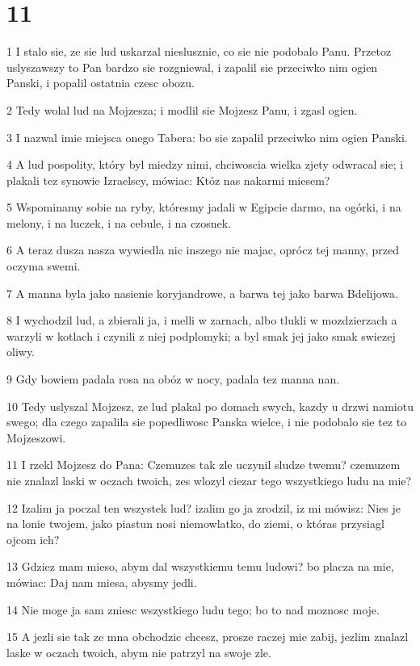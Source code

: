 \chapter{11}

\par 1 I stalo sie, ze sie lud uskarzal nieslusznie, co sie nie podobalo Panu. Przetoz uslyszawszy to Pan bardzo sie rozgniewal, i zapalil sie przeciwko nim ogien Panski, i popalil ostatnia czesc obozu.
\par 2 Tedy wolal lud na Mojzesza; i modlil sie Mojzesz Panu, i zgasl ogien.
\par 3 I nazwal imie miejsca onego Tabera: bo sie zapalil przeciwko nim ogien Panski.
\par 4 A lud pospolity, który byl miedzy nimi, chciwoscia wielka zjety odwracal sie; i plakali tez synowie Izraelscy, mówiac: Któz nas nakarmi miesem?
\par 5 Wspominamy sobie na ryby, któresmy jadali w Egipcie darmo, na ogórki, i na melony, i na luczek, i na cebule, i na czosnek.
\par 6 A teraz dusza nasza wywiedla nic inszego nie majac, oprócz tej manny, przed oczyma swemi.
\par 7 A manna byla jako nasienie koryjandrowe, a barwa tej jako barwa Bdelijowa.
\par 8 I wychodzil lud, a zbierali ja, i melli w zarnach, albo tlukli w mozdzierzach a warzyli w kotlach i czynili z niej podplomyki; a byl smak jej jako smak swiezej oliwy.
\par 9 Gdy bowiem padala rosa na obóz w nocy, padala tez manna nan.
\par 10 Tedy uslyszal Mojzesz, ze lud plakal po domach swych, kazdy u drzwi namiotu swego; dla czego zapalila sie popedliwosc Panska wielce, i nie podobalo sie tez to Mojzeszowi.
\par 11 I rzekl Mojzesz do Pana: Czemuzes tak zle uczynil sludze twemu? czemuzem nie znalazl laski w oczach twoich, zes wlozyl ciezar tego wszystkiego ludu na mie?
\par 12 Izalim ja poczal ten wszystek lud? izalim go ja zrodzil, iz mi mówisz: Nies je na lonie twojem, jako piastun nosi niemowlatko, do ziemi, o któras przysiagl ojcom ich?
\par 13 Gdziez mam mieso, abym dal wszystkiemu temu ludowi? bo placza na mie, mówiac: Daj nam miesa, abysmy jedli.
\par 14 Nie moge ja sam zniesc wszystkiego ludu tego; bo to nad moznosc moje.
\par 15 A jezli sie tak ze mna obchodzic chcesz, prosze raczej mie zabij, jezlim znalazl laske w oczach twoich, abym nie patrzyl na swoje zle.
